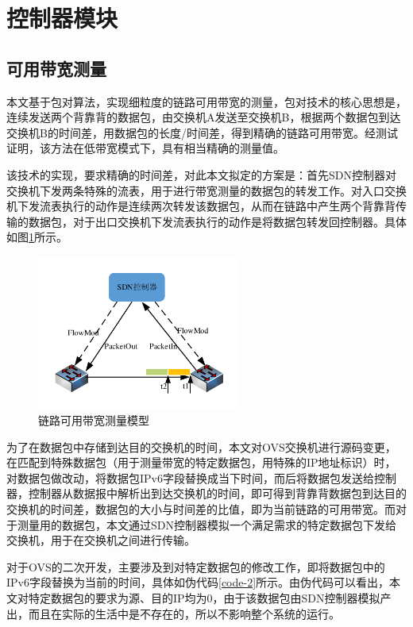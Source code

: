 \section{控制器模块}
\subsection{可用带宽测量}
本文基于包对算法，实现细粒度的链路可用带宽的测量，包对技术的核心思想是，连续发送两个背靠背的数据包，由交换机A发送至交换机B，根据两个数据包到达交换机B的时间差，用数据包的长度/时间差，得到精确的链路可用带宽。经测试证明，该方法在低带宽模式下，具有相当精确的测量值。

该技术的实现，要求精确的时间差，对此本文拟定的方案是：首先SDN控制器对交换机下发两条特殊的流表，用于进行带宽测量的数据包的转发工作。对入口交换机下发流表执行的动作是连续两次转发该数据包，从而在链路中产生两个背靠背传输的数据包，对于出口交换机下发流表执行的动作是将数据包转发回控制器。具体如图\ref{fig:spaceband}所示。

\begin{figure}[!htb]
  \centering
  \includegraphics[width=0.6\textwidth]{logo/spaceband}
  \caption{链路可用带宽测量模型}
  \label{fig:spaceband}
\end{figure}

为了在数据包中存储到达目的交换机的时间，本文对OVS交换机进行源码变更，在匹配到特殊数据包（用于测量带宽的特定数据包，用特殊的IP地址标识）时，对数据包做改动，将数据包IPv6字段替换成当下时间，而后将数据包发送给控制器，控制器从数据报中解析出到达交换机的时间，即可得到背靠背数据包到达目的交换机的时间差，数据包的大小与时间差的比值，即为当前链路的可用带宽。而对于测量用的数据包，本文通过SDN控制器模拟一个满足需求的特定数据包下发给交换机，用于在交换机之间进行传输。

对于OVS的二次开发，主要涉及到对特定数据包的修改工作，即将数据包中的IPv6字段替换为当前的时间，具体如伪代码\ref{code-2}所示。由伪代码可以看出，本文对特定数据包的要求为源、目的IP均为0，由于该数据包由SDN控制器模拟产出，而且在实际的生活中是不存在的，所以不影响整个系统的运行。

